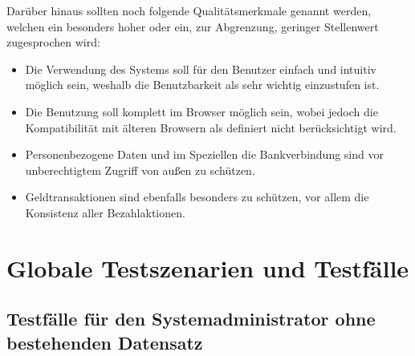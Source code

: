 \documentclass[a4paper]{scrreprt}
\newcounter{Lc}
\newcounter{Hc}
\newcommand{\resetAllCounter}{\setcounter{Lc}{0}\setcounter{Hc}{1}}
\begin{document}
	Darüber hinaus sollten noch folgende Qualitätsmerkmale genannt werden, welchen ein besonders hoher oder ein, zur Abgrenzung, geringer Stellenwert zugesprochen wird:
		\begin{itemize}
		 	\item Die Verwendung des Systems soll für den Benutzer einfach und intuitiv möglich sein, weshalb die Benutzbarkeit als sehr wichtig einzustufen ist.
		 	\item Die Benutzung soll komplett im Browser möglich sein, wobei jedoch die Kompatibilität mit älteren Browsern als definiert nicht berücksichtigt wird.
		 	\item Personenbezogene Daten und im Speziellen die Bankverbindung sind vor unberechtigtem Zugriff von außen zu schützen.
		 	\item Geldtransaktionen sind ebenfalls besonders zu schützen, vor allem die \gls{Konsistenz} aller Bezahlaktionen.
 \end{itemize}
 
\resetAllCounter
\newcommand{\Test}[1]{\stepcounter{Lc}\textcolor{Brown}{\textbf{/T\arabic{Hc}0-\arabic{Lc}0/} #1} \\}
\newcommand{\RefFuncBlue}[1]{\textcolor{Blue}{\textbf{#1}}}
\newcommand{\RefFuncGreen}[1]{\textcolor{Green}{\textbf{#1}}}
\chapter{Globale Testszenarien und Testfälle}
 

	\section{Testfälle für den Systemadministrator ohne bestehenden Datensatz}
\end{document}
